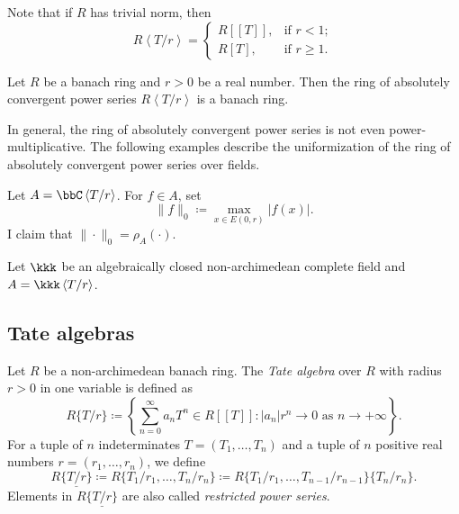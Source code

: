     Note that if \(R\) has trivial norm, then
    \[ R\left<T/r\right> = \begin{cases}
        R[[T]], & \text{if } r < 1; \\
        R[T], & \text{if } r \geq 1.
    \end{cases} \]

    \begin{proposition}\label{prop:ring_of_absolutely_convergent_power_series_is_banach_ring}
        Let \(R\) be a banach ring and \(r > 0\) be a real number.
        Then the ring of absolutely convergent power series \(R\left<T/r\right>\) is a banach ring.
    \end{proposition}

    In general, the ring of absolutely convergent power series is not even power-multiplicative.
    The following examples describe the uniformization of the ring of absolutely convergent power series over fields.

    \begin{example}\label{eg:uniformation_of_ring_of_absolutely_convergent_power_series_over_C}
        Let \(A = \bbC\left<T/r\right>\).
        For \(f \in A\), set 
        \[ \|f\|_0 \coloneq \max_{x \in E(0,r)} |f(x)|. \]
        I claim that \(\|\cdot\|_0 = \rho_A(\cdot)\).
    \end{example}

    \begin{example}\label{eg:uniformation_of_ring_of_absolutely_convergent_power_series_over_NA_fields}
        Let \(\kkk\) be an algebraically closed non-archimedean complete field and \(A = \kkk\left<T/r\right>\).

    \end{example}


\subsection{Tate algebras}

    \begin{definition}\label{def:Tate_algebra_over_banach_ring}
        Let \(R\) be a non-archimedean banach ring.
        The \emph{Tate algebra} over \(R\) with radius \(r > 0\) in one variable is defined as
        \[ R\{T/r\} \coloneqq \left\{ \sum_{n=0}^{\infty} a_n T^n \in R[[T]] : |a_n| r^n \to 0 \text{ as } n \to +\infty \right\}. \]
        For a tuple of \(n\) indeterminates \(T = (T_1, \ldots, T_n)\) and a tuple of \(n\) positive real numbers \(r = (r_1, \ldots, r_n)\), we define
        \[ R\{\underline{T/r}\} \coloneq R\{T_1/r_1, \ldots, T_n/r_n\} \coloneq R\{T_1/r_1, \ldots, T_{n-1}/r_{n-1}\}\{T_n/r_n\}. \]
        Elements in \(R\{\underline{T/r}\}\) are also called \emph{restricted power series}.
    \end{definition}

